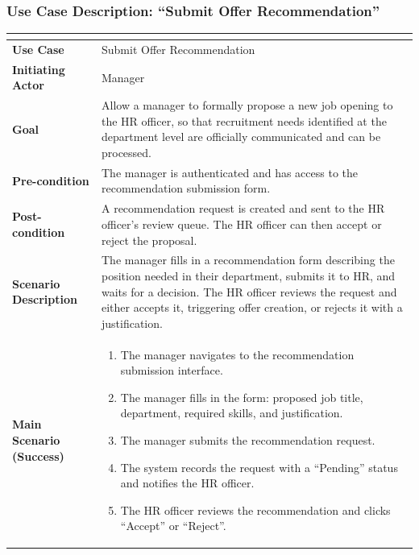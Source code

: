 \subsubsection{Use Case Description: ``Submit Offer Recommendation''}

\setlength{\tabcolsep}{4pt}
\renewcommand{\arraystretch}{1.2}
\begin{table}[H]
\centering
\small
\begin{tabularx}{\textwidth}{|>{\bfseries\arraybackslash}p{4cm}|X|}
\hline
\rowcolor{headerblue}
\multicolumn{2}{|c|}{\textbf{Use Case: Submit Offer Recommendation}} \\
\hline
Use Case            & Submit Offer Recommendation \\
\hline
Initiating Actor    & Manager \\
\hline
Goal                & Allow a manager to formally propose a new job opening to the HR officer, so that recruitment needs identified at the department level are officially communicated and can be processed. \\
\hline
Pre-condition       & The manager is authenticated and has access to the recommendation submission form. \\
\hline
Post-condition      & A recommendation request is created and sent to the HR officer's review queue. The HR officer can then accept or reject the proposal. \\
\hline
Scenario Description &
The manager fills in a recommendation form describing the position needed in their department, submits it to HR, and waits for a decision. The HR officer reviews the request and either accepts it, triggering offer creation, or rejects it with a justification. \\
\hline
Main Scenario (Success) &
\begin{enumerate}[leftmargin=*, label=\arabic*., topsep=0pt, itemsep=0pt]
    \item The manager navigates to the recommendation submission interface.
    \item The manager fills in the form: proposed job title, department, required skills, and justification.
    \item The manager submits the recommendation request.
    \item The system records the request with a ``Pending'' status and notifies the HR officer.
    \item The HR officer reviews the recommendation and clicks ``Accept'' or ``Reject''.

\end{enumerate}
\end{tabularx}
\end{table}
